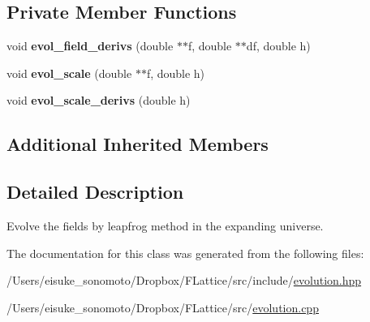\subsection*{Private Member Functions}
\begin{DoxyCompactItemize}
\item 
\mbox{\label{class_leap_frog_expansion_a7a155509a648425183fb0e9ac02b4beb}} 
void {\bfseries evol\+\_\+field\+\_\+derivs} (double $\ast$$\ast$f, double $\ast$$\ast$df, double h)
\item 
\mbox{\label{class_leap_frog_expansion_a9b7af3625b0aeea6f03d25f1bd8c6bd9}} 
void {\bfseries evol\+\_\+scale} (double $\ast$$\ast$f, double h)
\item 
\mbox{\label{class_leap_frog_expansion_a2ad530744c6ce8798da0442fbe35a228}} 
void {\bfseries evol\+\_\+scale\+\_\+derivs} (double h)
\end{DoxyCompactItemize}
\subsection*{Additional Inherited Members}


\subsection{Detailed Description}
Evolve the fields by leapfrog method in the expanding universe. 

The documentation for this class was generated from the following files\+:\begin{DoxyCompactItemize}
\item 
/\+Users/eisuke\+\_\+sonomoto/\+Dropbox/\+F\+Lattice/src/include/\mbox{\hyperlink{evolution_8hpp}{evolution.\+hpp}}\item 
/\+Users/eisuke\+\_\+sonomoto/\+Dropbox/\+F\+Lattice/src/\mbox{\hyperlink{evolution_8cpp}{evolution.\+cpp}}\end{DoxyCompactItemize}
